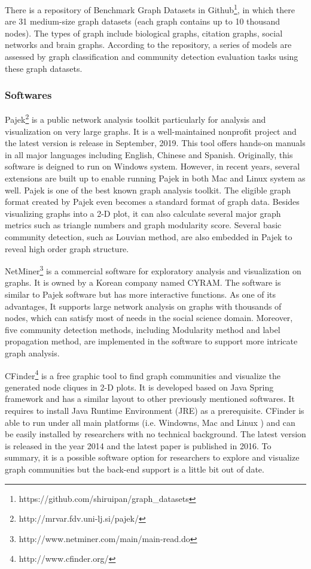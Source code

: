 There is a repository of Benchmark Graph Datasets in Github\footnote{https://github.com/shiruipan/graph\_datasets}, in which there are 31 medium-size graph datasets (each graph contains up to 10 thousand nodes). The types of graph include biological graphs, citation graphs, social networks and brain graphs. According to the repository, a series of models are assessed by graph classification and community detection evaluation tasks using these graph datasets.

\subsubsection{Softwares}

Pajek\footnote{http://mrvar.fdv.uni-lj.si/pajek/} is a public network analysis  toolkit particularly for analysis and visualization on very large graphs. It is a well-maintained nonprofit project and the latest version is release in September, 2019. This tool offers hands-on manuals in all major languages including English, Chinese and Spanish. Originally, this software is deigned to run on Windows system. However, in recent years, several extensions are built up to enable running Pajek in both Mac and Linux system as well. Pajek is one of the best known graph analysis toolkit. The eligible graph format created by Pajek even becomes a standard format of graph data. Besides visualizing graphs into a 2-D plot, it can also calculate several major graph metrics such as triangle numbers and graph modularity score.  Several basic community detection, such as Louvian method, are also embedded in Pajek to reveal high order graph structure.

NetMiner\footnote{http://www.netminer.com/main/main-read.do} is a commercial software for exploratory analysis and visualization on graphs. It is owned by a Korean company named CYRAM. The software is similar to Pajek software but has more interactive functions. As one of its advantages, It supports large network analysis on graphs with thousands of nodes, which can satisfy most of needs in the social science domain. Moreover, five community detection methods, including Modularity method and label propagation method, are implemented in the software to support more intricate graph analysis.  

CFinder\footnote{http://www.cfinder.org/} is a free graphic tool to find graph communities and visualize the generated node cliques in 2-D plots. It is developed based on Java Spring framework and has a similar layout to other previously mentioned softwares. It requires to install Java Runtime Environment (JRE) as a prerequisite. CFinder is able to run under all main platforms (i.e. Windowns, Mac and Linux ) and can be easily installed by researchers with no technical background. The latest version is released in the year 2014 and the latest paper is published in 2016. To summary, it is a possible software option for researchers to explore and visualize graph communities but the back-end support is a little bit out of date.  

